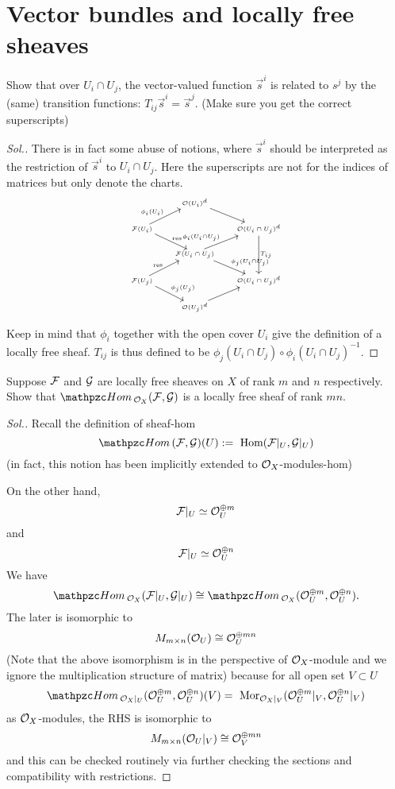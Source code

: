 \documentclass[11pt]{book} %
\begin{document}
\section{Vector bundles and locally free sheaves}
\begin{exr}
Show that over $U_i\cap U_j$, the vector-valued function $\vec{s}^i$ is related to ${s}^j$ by the (same) transition functions: $T_{ij} \vec{s}^{i}=\vec{s}^j$. (Make sure you get the correct superscripts)
\end{exr}
\begin{proof}[Sol.]
There is in fact some abuse of notions, where $\vec{s}^i$ should be interpreted as the restriction of $\vec{s}^i$ to $U_i\cap U_j$.
Here the superscripts are not for the indices of matrices but only denote the  charts.
$$
\tiny
\begin{tikzcd}
 & \calo(U_i)^d \arrow[rd] &  \\
\calf(U_i) \arrow[ru, "\phi_i(U_i)"] \arrow[rd, "\res"] &  & \calo(U_i\cap U_j)^d \arrow[dd, "T_{ij}"] \\
 & \calf(U_i\cap U_j) \arrow[rd, "\phi_j(U_i\cap U_j)"] \arrow[ru, "\phi_i(U_i\cap U_j)"] &  \\
\calf(U_j) \arrow[ru, "\res"] \arrow[rd, "\phi_j(U_j)"] &  & \calo(U_i\cap U_j)^d \\
 & \calo(U_j)^d \arrow[ru] & 
\end{tikzcd}
$$

Keep in mind that $\phi_i$ together with the open cover $U_i$ give the definition of a locally free sheaf. $T_{ij}$ is thus defined to be $\phi_j(U_i\cap U_j)\circ\phi_i(U_i\cap U_j)^{-1}$. 
\end{proof}
\begin{exr}
Suppose ${\cal F}$ and ${\cal G}$ are locally free sheaves on $X$ of rank $m$ and $n$ respectively. Show that $\phom_{\calo_X}(\calf , \calg)$ is a locally free sheaf of rank $mn$.
\end{exr}
\begin{proof}[Sol.]
Recall the definition of sheaf-hom
$$
\phom(\calf,\calg)(U):=\hom(\calf|_U,\calg|_U)
$$
(in fact, this notion has been implicitly extended to ${\cal O}_X$-modules-hom)

On the other hand, 
$$
{\cal F}|_U\simeq {\cal O}_U^{\oplus m}
$$
and
$$
{\cal F}|_U\simeq {\cal O}_U^{\oplus n}
$$
We have
$$
\phom_{\calo_X}(\calf|_U,\calg|_U)\cong\phom_{\calo_X}(\calo_U^{\oplus m},\calo_U^{\oplus n}).
$$
The later is isomorphic to 
$$
M_{m\times n}({\cal O}_U)\cong{\cal O}_U^{\oplus mn}
$$
(Note that the above isomorphism is in the perspective of ${\cal O}_X$-module and we ignore the multiplication structure of matrix)
because for all open set $V\subset U$
$$
\phom_{\calo_X|_U}(\calo_U^{\oplus m},\calo_U^{\oplus n})(V)=\mor_{\calo_X|_V}(\calo_U^{\oplus m}|_V,\calo_U^{\oplus n}|_V)
$$
as ${\cal O}_X$-modules, the RHS is isomorphic to
$$
M_{m\times n} ({\cal O}_U|_V)\cong {\cal O}_V^{\oplus mn}
$$
and this can be checked routinely via further checking the sections and compatibility with restrictions.

\end{proof}
\end{document}
